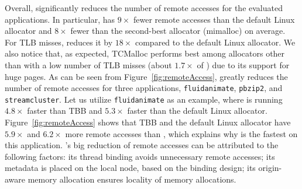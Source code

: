 Overall, \NM{} significantly reduces the number of remote accesses for the evaluated applications. In particular, \NM{} has $9\times$ fewer remote accesses than the default Linux allocator and $8\times$ fewer than the second-best allocator (mimalloc) on average. For TLB misses, \NM{} reduces it by $18\times$ compared to the default Linux allocator. We also notice that, as expected, TCMalloc performs best among allocators other than \NM{} with a low number of TLB misses (about $1.7\times$ of \NM{}) due to its support for huge pages.
As can be seen from Figure~\ref{fig:remoteAccess}, \NM{} greatly reduces the number of remote accesses for three applications, \texttt{fluidanimate}, \texttt{pbzip2}, and \texttt{streamcluster}. Let us utilize \texttt{fluidanimate} as an example, where \NM{} is running $4.8\times$ faster than TBB and $5.3\times$ faster than the default Linux allocator. Figure~\ref{fig:remoteAccess} shows that TBB and the default Linux allocator have $5.9\times$ and $6.2\times$ more remote accesses than \NM{}, which explains why \NM{} is the fastest on this application. \NM{}'s big reduction of remote accesses can be attributed to the following factors: its thread binding avoids unnecessary remote accesses; its metadata is placed on the local node, based on the binding design; its origin-aware memory allocation ensures locality of memory allocations.

